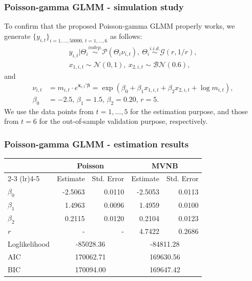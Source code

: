 \documentclass[ignorenonframetext,]{beamer}
\begin{document}
\begin{frame}
\frametitle{Poisson-gamma GLMM - simulation study}

To confirm that the proposed Poisson-gamma GLMM properly works, we generate $\{y_{i,t}\}_{i=1,\ldots,50000, \, t=1,\ldots,6}$ as follows:
\begin{gather*}
y_{i,t}|\Theta_i \overset{indep.}\sim \mathcal{P}(\Theta_i \nu_{i,t}), \ \Theta_i \overset{i.i.d.}\sim \mathcal{G}(r, 1/r), \\
x_{1,i,t} \sim \mathcal{N}(0,1), \ x_{2,i,t} \sim \mathcal{BN}(0.6),
\end{gather*}
and
\begin{align*}
\nu_{i,t} &= m_{i,t} \cdot e^{\mathbf{x}_{i,t}'\bm{\beta}} = \exp(\beta_0 + \beta_1 x_{1,i,t} + \beta_2 x_{2,i,t} + \log m_{i,t}), \\
\beta_0 &= -2.5, \, \beta_1 = 1.5, \, \beta_2 = 0.20, \, r = 5.
\end{align*}
We use the data points from $t=1,\ldots,5$ for the estimation purpose, and those from $t=6$ for the out-of-sample validation purpose, respectively.

\end{frame}

\begin{frame}
\frametitle{Poisson-gamma GLMM - estimation results}

\begin{table}[ht]
\centering
\begin{tabular}{lrrrr}
\toprule
 & \multicolumn{2}{c}{Poisson} & \multicolumn{2}{c}{MVNB} \\
\cmidrule(lr){2-3} \cmidrule(lr){4-5}
 & Estimate & Std. Error & Estimate & Std. Error \\
\midrule
$\beta_0$ & -2.5063 & 0.0110 & -2.5053 & 0.0113 \\
$\beta_1$ & 1.4963 & 0.0096 & 1.4959 & 0.0100 \\
$\beta_2$ & 0.2115 & 0.0120 & 0.2104 & 0.0123 \\
$r$ & - & - & 4.7422 & 0.2686 \\
Loglikelihood & \multicolumn{2}{c}{-85028.36} & \multicolumn{2}{c}{-84811.28} \\
AIC & \multicolumn{2}{c}{170062.71} & \multicolumn{2}{c}{169630.56} \\
BIC & \multicolumn{2}{c}{170094.00} & \multicolumn{2}{c}{169647.42} \\
\hline\hline
\end{tabular}
\end{table}

\end{frame}
\end{document}
